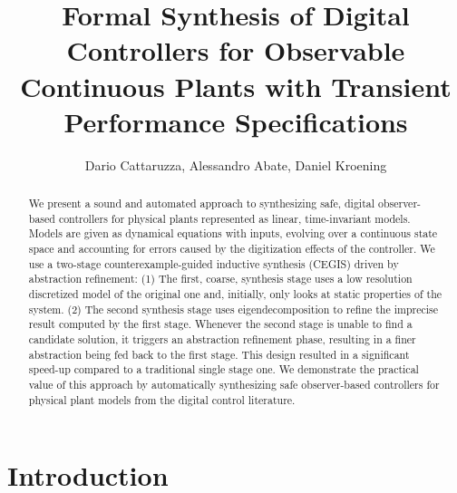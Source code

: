 \documentclass[sigconf]{llncs}
\begin{document}
\title{Formal Synthesis of Digital Controllers for Observable Continuous
Plants with Transient Performance Specifications}

\author{Dario Cattaruzza, Alessandro Abate, Daniel Kroening}%



\maketitle


\begin{abstract} 
%
We present a sound and automated approach to synthesizing safe,
digital observer-based controllers for physical plants represented as
linear, time-invariant models.  Models are given as dynamical
equations with inputs, evolving over a continuous state space and
accounting for errors caused by the digitization effects of the
controller.  We use a two-stage counterexample-guided inductive
synthesis (CEGIS) driven by abstraction refinement: (1) The first,
coarse, synthesis stage uses a low resolution discretized model of the
original one and, initially, only looks at static properties of the
system.  (2) The second synthesis stage uses eigendecomposition to
refine the imprecise result computed by the first stage.  Whenever the
second stage is unable to find a candidate solution, it triggers an
abstraction refinement phase, resulting in a finer abstraction being
fed back to the first stage.  This design resulted in a significant
speed-up compared to a traditional single stage one.  We demonstrate
the practical value of this approach by automatically synthesizing
safe observer-based controllers for physical plant models from the
digital control literature.
%
\end{abstract}

\section{Introduction}
\end{document}
